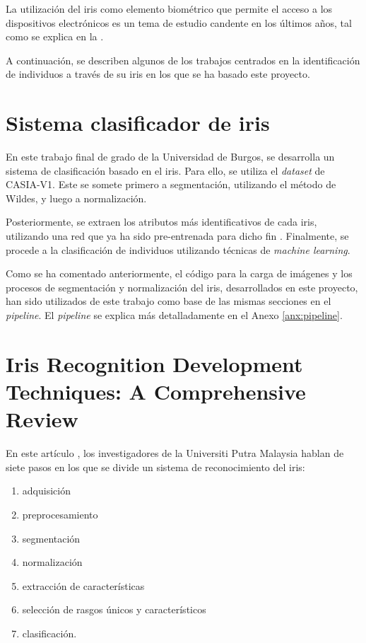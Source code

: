  \label{capitulo6}

La utilización del iris como elemento biométrico que permite el acceso a los dispositivos electrónicos es un tema de estudio candente en los últimos años, 
tal como se explica en la .

A continuación, se describen algunos de los trabajos centrados en la identificación de individuos a través de su iris en los que se ha basado este proyecto.

\section{Sistema clasificador de iris}

En este trabajo final de grado \cite{tfg_iris_2020} de la Universidad de Burgos, se desarrolla un sistema de clasificación basado en el iris. Para ello, se utiliza el \textit{dataset} 
de CASIA-V1. Este se somete primero a segmentación, utilizando el método de Wildes, y luego a normalización. 

Posteriormente, se extraen los atributos más identificativos de cada iris,
 utilizando una red que ya ha sido pre-entrenada para dicho fin \cite{lozej_end--end_2018}. Finalmente, se procede a la clasificación de individuos utilizando técnicas de \textit{machine learning}.

Como se ha comentado anteriormente, el código para la carga de imágenes y los procesos de segmentación y normalización del iris, desarrollados en este proyecto, han sido utilizados de este trabajo como 
base de las mismas secciones en el \textit{pipeline}. El \textit{pipeline} se explica más detalladamente en el Anexo \ref{anx:pipeline}.

\section{Iris Recognition Development Techniques: A Comprehensive Review}

En este artículo \cite{malgheet_iris_2021}, los investigadores de la Universiti Putra Malaysia hablan de siete pasos en los que se divide un sistema de reconocimiento del iris:
\begin{enumerate}
\item adquisición
\item preprocesamiento
\item segmentación
\item normalización
\item extracción de características
\item selección de rasgos únicos y característicos
\item clasificación. 
\end{enumerate}
 
